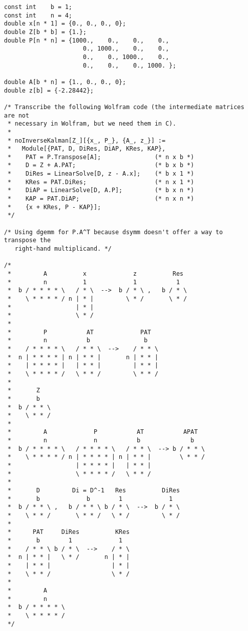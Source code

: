 \documentclass[10pt,oneside,x11names]{article}
\begin{document}
\begin{verbatim}
const int    b = 1;
const int    n = 4;
double x[n * 1] = {0., 0., 0., 0};
double Z[b * b] = {1.};
double P[n * n] = {1000.,    0.,    0.,    0.,
                      0., 1000.,    0.,    0.,
                      0.,    0., 1000.,    0.,
                      0.,    0.,    0., 1000. };

double A[b * n] = {1., 0., 0., 0};
double z[b] = {-2.28442};

/* Transcribe the following Wolfram code (the intermediate matrices are not
 * necessary in Wolfram, but we need them in C).
 *
 * noInverseKalman[Z_][{x_, P_}, {A_, z_}] :=
 *   Module[{PAT, D, DiRes, DiAP, KRes, KAP},
 *    PAT = P.Transpose[A];               (* n x b *)
 *    D = Z + A.PAT;                      (* b x b *)
 *    DiRes = LinearSolve[D, z - A.x];    (* b x 1 *)
 *    KRes = PAT.DiRes;                   (* n x 1 *)
 *    DiAP = LinearSolve[D, A.P];         (* b x n *)
 *    KAP = PAT.DiAP;                     (* n x n *)
 *    {x + KRes, P - KAP}];
 */

/* Using dgemm for P.A^T because dsymm doesn't offer a way to transpose the
   right-hand multiplicand. */

/*
 *         A          x             z          Res
 *         n          1             1           1
 *  b / * * * * \   / * \  -->  b / * \ ,   b / * \
 *    \ * * * * / n | * |         \ * /       \ * /
 *                  | * |
 *                  \ * /
 *
 *         P           AT             PAT
 *         n           b               b
 *    / * * * * \   / * * \  -->    / * * \
 *  n | * * * * | n | * * |       n | * * |
 *    | * * * * |   | * * |         | * * |
 *    \ * * * * /   \ * * /         \ * * /
 *
 *       Z
 *       b
 *  b / * * \
 *    \ * * /
 *
 *         A             P           AT           APAT
 *         n             n           b              b
 *  b / * * * * \   / * * * * \   / * * \  --> b / * * \
 *    \ * * * * / n | * * * * | n | * * |        \ * * /
 *                  | * * * * |   | * * |
 *                  \ * * * * /   \ * * /
 *
 *       D         Di = D^-1   Res          DiRes
 *       b             b        1             1
 *  b / * * \ ,   b / * * \ b / * \  -->  b / * \
 *    \ * * /       \ * * /   \ * /         \ * /
 *
 *      PAT     DiRes          KRes
 *       b        1             1
 *    / * * \ b / * \  -->    / * \
 *  n | * * |   \ * /       n | * |
 *    | * * |                 | * |
 *    \ * * /                 \ * /
 *
 *         A
 *         n
 *  b / * * * * \
 *    \ * * * * /
 */


\end{verbatim}
\end{document}
